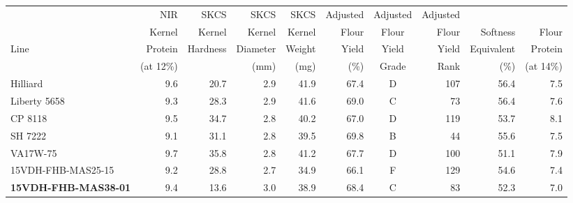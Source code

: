 \documentclass[12pt, letterpaper]{article}
\begin{document}
\begin{landscape}
\begin{table}[ht]
\begin{tabular}{lrrrrrcrrr}
  \hline
     & NIR       & SKCS     & SKCS     & SKCS   & Adjusted & Adjusted & Adjusted &            &           \\ 
     & Kernel    & Kernel   & Kernel   & Kernel & Flour    & Flour    & Flour    & Softness   & Flour     \\ 
Line & Protein   & Hardness & Diameter & Weight & Yield    & Yield    & Yield    & Equivalent & Protein   \\ 
     & (at 12\%) &          & (mm)     & (mg)   & (\%)     &  Grade   & Rank     & (\%)       & (at 14\%) \\ 
  \hline
  Hilliard           & 9.6 & 20.7 & 2.9 & 41.9 & 67.4 & D & 107 & 56.4 & 7.5 \\ 
  Liberty 5658       & 9.3 & 28.3 & 2.9 & 41.6 & 69.0 & C & 73  & 56.4 & 7.6 \\ 
  CP 8118            & 9.5 & 34.7 & 2.8 & 40.2 & 67.0 & D & 119 & 53.7 & 8.1 \\ 
  SH 7222            & 9.1 & 31.1 & 2.8 & 39.5 & 69.8 & B & 44  & 55.6 & 7.5 \\ 
  VA17W-75           & 9.7 & 35.8 & 2.8 & 41.2 & 67.7 & D & 100 & 51.1 & 7.9 \\ 
  15VDH-FHB-MAS25-15 & 9.2 & 28.8 & 2.7 & 34.9 & 66.1 & F & 129 & 54.6 & 7.4 \\ 
  \textbf{15VDH-FHB-MAS38-01} & 9.4 & 13.6 & 3.0 & 38.9 & 68.4 & C & 83  & 52.3 & 7.0 \\ 

\end{tabular}
\end{table}
\end{landscape}
\end{document}
